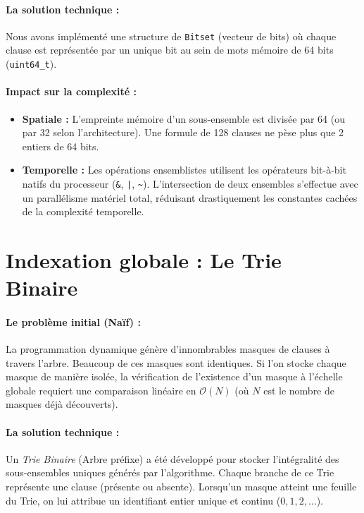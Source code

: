 \documentclass[11pt,a4paper]{report}
\begin{document}
\paragraph{La solution technique :}
Nous avons implémenté une structure de \texttt{Bitset} (vecteur de bits) où chaque clause est représentée par un unique bit au sein de mots mémoire de 64 bits (\texttt{uint64\_t}).

\paragraph{Impact sur la complexité :}
\begin{itemize}
    \item \textbf{Spatiale :} L'empreinte mémoire d'un sous-ensemble est divisée par 64 (ou par 32 selon l'architecture). Une formule de 128 clauses ne pèse plus que 2 entiers de 64 bits.
    \item \textbf{Temporelle :} Les opérations ensemblistes utilisent les opérateurs bit-à-bit natifs du processeur (\texttt{\&}, \texttt{|}, \texttt{\textasciitilde}). L'intersection de deux ensembles s'effectue avec un parallélisme matériel total, réduisant drastiquement les constantes cachées de la complexité temporelle.
\end{itemize}

\section*{Indexation globale : Le Trie Binaire}

\paragraph{Le problème initial (Naïf) :}
La programmation dynamique génère d'innombrables masques de clauses à travers l'arbre. Beaucoup de ces masques sont identiques. Si l'on stocke chaque masque de manière isolée, la vérification de l'existence d'un masque à l'échelle globale requiert une comparaison linéaire en $\mathcal{O}(N)$ (où $N$ est le nombre de masques déjà découverts).

\newpage
\paragraph{La solution technique :}
Un \textit{Trie Binaire} (Arbre préfixe) a été développé pour stocker l'intégralité des sous-ensembles uniques générés par l'algorithme. Chaque branche de ce Trie représente une clause (présente ou absente). Lorsqu'un masque atteint une feuille du Trie, on lui attribue un identifiant entier unique et continu ($0, 1, 2, \dots$).
\end{document}

